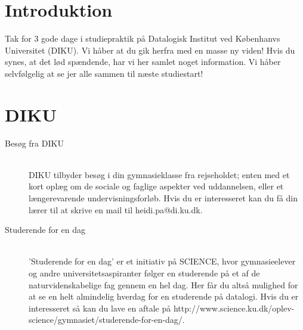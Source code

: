 \documentclass[11pt]{article}
\begin{document}
\section{Introduktion}
Tak for 3 gode dage i studiepraktik på Datalogisk Institut ved Københanvs Universitet (DIKU). Vi håber at du gik herfra med en masse ny viden! Hvis du synes, at det lød spændende, har vi her samlet noget information. Vi håber selvfølgelig at se jer alle sammen til næste studiestart!

\section{DIKU}
\begin{description}
    \item[Besøg fra DIKU]~\\
        DIKU tilbyder besøg i din gymnasieklasse fra rejseholdet; enten med et kort oplæg om de sociale og faglige aspekter ved uddannelsen, eller et længerevarende undervisningsforløb. Hvis du er interesseret kan du få din lærer til at skrive en mail til heidi.pa@di.ku.dk.
    \item[Studerende for en dag]~\\
        ’Studerende for en dag’ er et initiativ på SCIENCE, hvor gymnasieelever og andre universitetsaspiranter følger en studerende på et af de naturvidenskabelige fag gennem en hel dag. Her får du altså mulighed for at se en helt almindelig hverdag for en studerende på datalogi. Hvis du er interesseret så kan du lave en aftale på http://www.science.ku.dk/oplev-science/gymnasiet/studerende-for-en-dag/.
\end{description}
\end{document}
